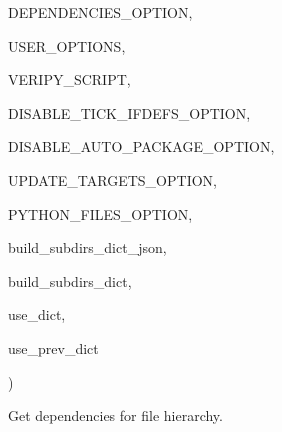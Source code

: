 {{\begin{DoxyParamCaption}
\item[{}]{D\-E\-P\-E\-N\-D\-E\-N\-C\-I\-E\-S\-\_\-\-O\-P\-T\-I\-O\-N, }
\item[{}]{U\-S\-E\-R\-\_\-\-O\-P\-T\-I\-O\-N\-S, }
\item[{}]{V\-E\-R\-I\-P\-Y\-\_\-\-S\-C\-R\-I\-P\-T, }
\item[{}]{D\-I\-S\-A\-B\-L\-E\-\_\-\-T\-I\-C\-K\-\_\-\-I\-F\-D\-E\-F\-S\-\_\-\-O\-P\-T\-I\-O\-N, }
\item[{}]{D\-I\-S\-A\-B\-L\-E\-\_\-\-A\-U\-T\-O\-\_\-\-P\-A\-C\-K\-A\-G\-E\-\_\-\-O\-P\-T\-I\-O\-N, }
\item[{}]{U\-P\-D\-A\-T\-E\-\_\-\-T\-A\-R\-G\-E\-T\-S\-\_\-\-O\-P\-T\-I\-O\-N, }
\item[{}]{P\-Y\-T\-H\-O\-N\-\_\-\-F\-I\-L\-E\-S\-\_\-\-O\-P\-T\-I\-O\-N, }
\item[{}]{build\-\_\-subdirs\-\_\-dict\-\_\-json, }
\item[{}]{build\-\_\-subdirs\-\_\-dict, }
\item[{}]{use\-\_\-dict, }
\item[{}]{use\-\_\-prev\-\_\-dict}
\end{DoxyParamCaption}
)}}\label{namespaceveripy__build_a8ce0c16c133c1fe238b95b074a4e084e}


Get dependencies for file hierarchy. 


